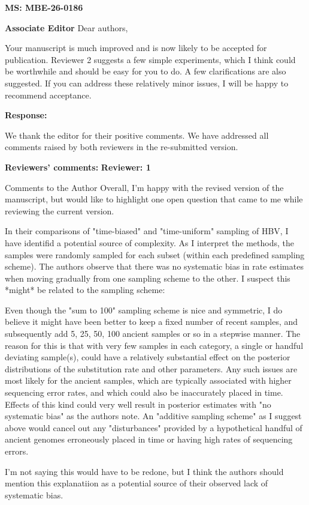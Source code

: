 \documentclass[11pt]{article}
\begin{document}
\textbf{MS: MBE-26-0186}

\textbf{Associate Editor}
Dear authors,

Your manuscript is much improved and is now likely to be accepted for publication.  Reviewer 2 suggests a few simple experiments, which I think could be worthwhile and should be easy for you to do.  A few clarifications are also suggested.  If you can address these relatively minor issues, I will be happy to recommend acceptance.

{\color{blue}
\textbf{Response:}

We thank the editor for their positive comments. We have addressed all comments raised by both reviewers in the re-submitted version.
}

\textbf{Reviewers' comments:}
\textbf{Reviewer: 1}

Comments to the Author
Overall, I'm happy with the revised version of the manuscript, but would like to highlight one open question that came to me while reviewing the current version.

In their comparisons of "time-biased" and "time-uniform" sampling of HBV, I have identifid a potential source of complexity. As I interpret the methods, the samples were randomly sampled for each subset (within each predefined sampling scheme). The authors observe that there was no systematic bias in rate estimates when moving gradually from one sampling scheme to the other. I suspect this *might* be related to the sampling scheme:

Even though the "sum to 100" sampling scheme is nice and symmetric, I do believe it might have been better to keep a fixed number of recent samples, and subsequently add 5, 25, 50, 100 ancient samples or so in a stepwise manner. The reason for this is that with very few samples in each category, a single or handful deviating sample(s), could have a relatively substantial effect on the posterior distributions of the substitution rate and other parameters. Any such issues are most likely for the ancient samples, which are typically associated with higher sequencing error rates, and which could also be inaccurately placed in time. Effects of this kind could very well result in posterior estimates with "no systematic bias" as the authors note. An "additive sampling scheme" as I suggest above would cancel out any "disturbances" provided by a hypothetical handful of ancient genomes erroneously placed in time or having high rates of sequencing errors.

I'm not saying this would have to be redone, but I think the authors should mention this explanatiion as a potential source of their observed lack of systematic bias.
\end{document}
